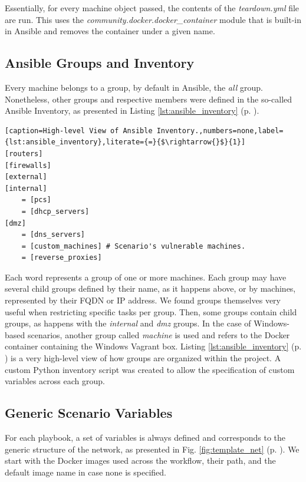 Essentially, for every machine object passed, the contents of the \textit{teardown.yml} file are run. This uses the \textit{community.docker.docker\_container} module that is built-in in Ansible and removes the container under a given name.

\subsection{Ansible Groups and Inventory} \label{sec:ansible_groups_inventory}


Every machine belongs to a group, by default in Ansible, the \textit{all} group. Nonetheless, other groups and respective members were defined in the so-called Ansible Inventory, as presented in Listing \ref{lst:ansible_inventory} (p. \pageref{lst:ansible_inventory}).

\begin{lstlisting}[caption=High-level View of Ansible Inventory.,numbers=none,label={lst:ansible_inventory},literate={=}{$\rightarrow{}$}{1}]
[routers]
[firewalls]
[external]
[internal]
    = [pcs]
    = [dhcp_servers]
[dmz]
    = [dns_servers]
    = [custom_machines] # Scenario's vulnerable machines.
    = [reverse_proxies]
\end{lstlisting}

Each word represents a group of one or more machines. Each group may have several child groups defined by their name, as it happens above, or by machines, represented by their FQDN or IP address. We found groups themselves very useful when restricting specific tasks per group. Then, some groups contain child groups, as happens with the \textit{internal} and \textit{dmz} groups. In the case of Windows-based scenarios, another group called \textit{machine} is used and refers to the Docker container containing the Windows Vagrant box. Listing \ref{lst:ansible_inventory} (p. \pageref{lst:ansible_inventory}) is a very high-level view of how groups are organized within the project. A custom Python inventory script was created to allow the specification of custom variables across each group.

\subsection{Generic Scenario Variables} \label{sec:generic_scenario_variables}

For each playbook, a set of variables is always defined and corresponds to the generic structure of the network, as presented in Fig. \ref{fig:template_net} (p. \pageref{fig:template_net}). We start with the Docker images used across the workflow, their path, and the default image name in case none is specified.

